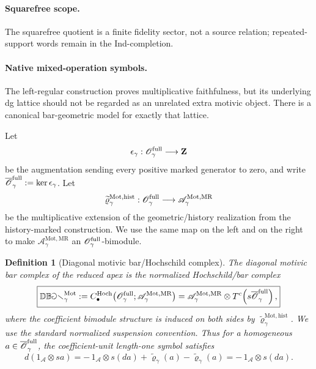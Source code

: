\documentclass[11pt]{article}
\newtheorem{definition}[theorem]{Definition}
\theoremstyle{remark}
\newcommand{\Z}{\mathbf Z}
\newcommand{\Mot}{\mathrm{Mot}}
\newcommand{\MR}{\mathrm{MR}}
\begin{document}
\paragraph{Squarefree scope.}
The squarefree quotient is a finite fidelity sector, not a source relation;
repeated-support words remain in the Ind-completion.


\paragraph{Native mixed-operation symbols.}


The left-regular construction proves multiplicative faithfulness, but its
underlying dg lattice should not be regarded as an unrelated extra motivic
object.  There is a canonical bar-geometric model for exactly that lattice.

Let
\[
 \epsilon_\gamma:\mathscr O_\gamma^{\rm full}\longrightarrow\Z
\]
be the augmentation sending every positive marked generator to zero, and write
\(\overline{\mathscr O}_\gamma^{\rm full}:=\ker\epsilon_\gamma\).
Let
\[
 \widetilde\varrho_{\gamma}^{\Mot,\mathrm{hist}}:
 \mathscr O_\gamma^{\rm full}
 \longrightarrow
 \mathscr A_\gamma^{\Mot,\MR}
\]
be the multiplicative extension of the geometric/history realization from
the history-marked construction.  We use the same map on the left and on the right to make
\(\mathscr A_\gamma^{\Mot,\MR}\) an
\(\mathscr O_\gamma^{\rm full}\)-bimodule.

\begin{definition}[Diagonal motivic bar/Hochschild complex]
\label{P2M-def:v23-diagonal-bar-complex}
The \emph{diagonal motivic bar complex} of the reduced apex is the normalized
Hochschild/bar complex
\begin{equation}
 \boxed{
 \mathbb{DBar}_{\gamma}^{\Mot}
 :=
 C_\bullet^{\rm Hoch}\!\left(
   \mathscr O_\gamma^{\rm full};
   \mathscr A_\gamma^{\Mot,\MR}
 \right)
 =
 \mathscr A_\gamma^{\Mot,\MR}
 \otimes
 T^c\!\left(s\overline{\mathscr O}_\gamma^{\rm full}\right),}
\end{equation}
where the coefficient bimodule structure is induced on both sides by
\(\widetilde\varrho_{\gamma}^{\Mot,\mathrm{hist}}\).
We use the standard normalized suspension convention.  Thus for a homogeneous
\(a\in\overline{\mathscr O}_\gamma^{\rm full}\), the coefficient-unit
length-one symbol satisfies
\begin{equation}\label{P2M-eq:v23-length-one-bar-differential}
 d\!\left(1_{\mathscr A}\otimes sa\right)
 =
 -\,1_{\mathscr A}\otimes s(da)
 +\widetilde\varrho_\gamma(a)
 -\widetilde\varrho_\gamma(a)
 =
 -\,1_{\mathscr A}\otimes s(da).
\end{equation}
\end{definition}
\end{document}
